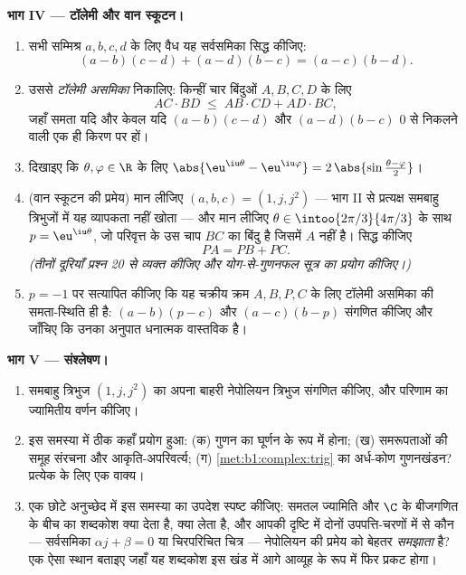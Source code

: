 \begin{problem}
\medskip \noindent\textbf{भाग IV --- टॉलेमी और वान स्कूटन।}
\begin{enumerate}[resume]
  \item सभी सम्मिश्र $a, b, c, d$ के लिए वैध यह सर्वसमिका सिद्ध कीजिए:
        \[
        (a - b)(c - d) + (a - d)(b - c) = (a - c)(b - d) .
        \]
  \item उससे \emph{टॉलेमी असमिका} निकालिए: किन्हीं चार
  बिंदुओं $A, B, C, D$ के लिए
        \[
        AC \cdot BD \;\leq\; AB \cdot CD + AD \cdot BC ,
        \]
        जहाँ समता यदि और केवल यदि $(a-b)(c-d)$ और $(a-d)(b-c)$ $0$ से निकलने
        वाली एक ही किरण पर हों।
  \item दिखाइए कि $\theta, \varphi \in \R$ के लिए $\abs{\eu^{\iu\theta} -
  \eu^{\iu\varphi}} = 2\,\abs{\sin\frac{\theta - \varphi}2}$।
  \item (वान स्कूटन की प्रमेय) मान लीजिए $(a, b,
  c) = (1, j, j^2)$ --- भाग II से प्रत्यक्ष समबाहु त्रिभुजों में यह व्यापकता
  नहीं खोता --- और मान लीजिए $\theta \in \intoo{2\pi/3}{4\pi/3}$ के साथ $p =
  \eu^{\iu\theta}$, जो परिवृत्त के उस चाप $BC$ का बिंदु है जिसमें $A$ नहीं
  है। सिद्ध कीजिए
        \[
        PA = PB + PC .
        \]
        \emph{(तीनों दूरियाँ प्रश्न 20 से व्यक्त कीजिए और योग-से-गुणनफल
        सूत्र का प्रयोग कीजिए।)}
  \item $p = -1$ पर सत्यापित कीजिए कि यह चक्रीय क्रम $A, B, P, C$ के लिए
  टॉलेमी असमिका की समता-स्थिति ही है: $(a - b)(p - c)$ और $(a - c)(b - p)$
  संगणित कीजिए और जाँचिए कि उनका अनुपात धनात्मक वास्तविक है।
\end{enumerate}

\medskip \noindent\textbf{भाग V --- संश्लेषण।}
\begin{enumerate}[resume]
  \item समबाहु त्रिभुज $(1, j, j^2)$ का अपना बाहरी नेपोलियन त्रिभुज संगणित
  कीजिए, और परिणाम का ज्यामितीय वर्णन कीजिए।
  \item इस समस्या में ठीक कहाँ प्रयोग हुआ: (क) गुणन का घूर्णन के रूप में
  होना; (ख) समरूपताओं की समूह संरचना और आकृति-अपरिवर्त्य; (ग)
  \cref{met:b1:complex:trig} का अर्ध-कोण गुणनखंडन? प्रत्येक के लिए एक वाक्य।
  \item एक छोटे अनुच्छेद में इस समस्या का उपदेश स्पष्ट कीजिए: समतल ज्यामिति
  और $\C$ के बीजगणित के बीच का शब्दकोश क्या देता है, क्या लेता है, और आपकी
  दृष्टि में दोनों उपपत्ति-चरणों में से कौन --- सर्वसमिका $\alpha j + \beta
  = 0$ या चिरपरिचित चित्र --- नेपोलियन की प्रमेय को बेहतर \emph{समझाता} है?
  एक ऐसा स्थान बताइए जहाँ यह शब्दकोश इस खंड में आगे आव्यूह के रूप में फिर
  प्रकट होगा।
\end{enumerate}
\end{problem}
